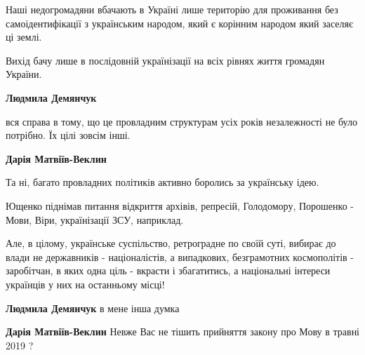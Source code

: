 \begin{itemize}
Наші недогромадяни вбачають в Україні лише територію для проживання без
самоідентифікації з українським народом, який є корінним народом який заселяє
ці землі.

Вихід бачу лише в послідовній українізації на всіх рівнях життя громадян
України.

\begin{itemize}
 
\textbf{Людмила Демянчук} 

вся справа в тому, що це провладним структурам усіх років незалежності не було
потрібно. Їх цілі зовсім інші.


 
\textbf{Дарія Матвіїв-Веклин}

Та ні, багато провладних політиків активно боролись за українську ідею.

Ющенко піднімав питання відкриття архівів, репресій, Голодомору, Порошенко -
Мови, Віри, українізації ЗСУ, наприклад.

Але, в цілому, українське суспільство, ретроградне по своїй суті, вибирає до
влади не державників - націоналістів, а випадкових, безграмотних космополітів -
заробітчан, в яких одна ціль - вкрасти і збагатитись, а національні інтереси
українців у них на останньому місці!


 
\textbf{Людмила Демянчук} в мене інша думка

 
\textbf{Дарія Матвіїв-Веклин}
Невже Вас не тішить прийняття закону про Мову в травні 2019 ?


\end{itemize}
\end{itemize}
